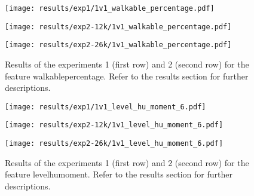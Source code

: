 \begin{figure}[h!]
	\centering
	\begin{minipage}{0.4\linewidth}
		\texttt{[image: results/exp1/1v1\_walkable\_percentage.pdf]}
	\end{minipage}
	
	\begin{minipage}{0.4\linewidth}
		\texttt{[image: results/exp2-12k/1v1\_walkable\_percentage.pdf]}
	\end{minipage}
	\begin{minipage}{0.4\linewidth}
		\texttt{[image: results/exp2-26k/1v1\_walkable\_percentage.pdf]}
	\end{minipage}
	
	\caption[ Results: Feature walkable\textunderscore percentage]{ Results of the experiments 1 (first row) and 2 (second row) for the feature walkable\textunderscore percentage. Refer to the results section for further descriptions. }
	\label{fig:appendix_walkable_percentage}
\end{figure}

\begin{figure}[h!]
	\centering
	\begin{minipage}{0.4\linewidth}
		\texttt{[image: results/exp1/1v1\_level\_hu\_moment\_6.pdf]}
	\end{minipage}
	
	\begin{minipage}{0.4\linewidth}
		\texttt{[image: results/exp2-12k/1v1\_level\_hu\_moment\_6.pdf]}
	\end{minipage}
	\begin{minipage}{0.4\linewidth}
		\texttt{[image: results/exp2-26k/1v1\_level\_hu\_moment\_6.pdf]}
	\end{minipage}
	
	\caption[ Results: Feature level\textunderscore hu\textunderscore moment]{ Results of the experiments 1 (first row) and 2 (second row) for the feature level\textunderscore hu\textunderscore moment. Refer to the results section for further descriptions. }
	\label{fig:appendix_level_hu_moment_6}
\end{figure}
\newpage 


